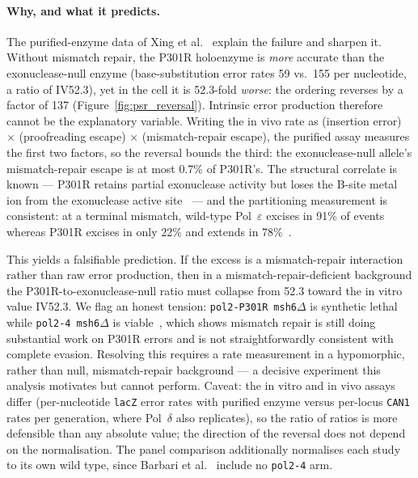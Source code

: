 \documentclass[11pt,a4paper]{article}
\theoremstyle{definition}
\begin{document}
\paragraph{Why, and what it predicts.} The purified-enzyme data of Xing et
al.~\cite{xing2019} explain the failure and sharpen it. Without mismatch repair, the P301R
holoenzyme is \emph{more} accurate than the exonuclease-null enzyme (base-substitution error
rates 59 vs.\ 155 per nucleotide, a ratio of IV52.3), yet in the cell it is 52.3-fold
\emph{worse}: the ordering reverses by a factor of 137 (Figure~\ref{fig:psr_reversal}).
Intrinsic error production therefore cannot be the explanatory variable. Writing the in vivo
rate as (insertion error) $\times$ (proofreading escape) $\times$ (mismatch-repair escape),
the purified assay measures the first two factors, so the reversal bounds the third: the
exonuclease-null allele's mismatch-repair escape is at most 0.7\% of P301R's. The structural
correlate is known --- P301R retains partial exonuclease activity but loses the B-site metal
ion from the exonuclease active site~\cite{parkash2019} --- and the partitioning measurement
is consistent: at a terminal mismatch, wild-type Pol~$\varepsilon$ excises in 91\% of events
whereas P301R excises in only 22\% and extends in 78\%~\cite{xing2019}.

This yields a falsifiable prediction. If the excess is a mismatch-repair interaction rather
than raw error production, then in a mismatch-repair-deficient background the
P301R-to-exonuclease-null ratio must collapse from 52.3 toward the in vitro value IV52.3.
We flag an honest tension: \texttt{pol2-P301R}~\texttt{msh6}$\Delta$ is synthetic lethal while
\texttt{pol2-4}~\texttt{msh6}$\Delta$ is viable~\cite{xing2019}, which shows mismatch repair is
still doing substantial work on P301R errors and is not straightforwardly consistent with
complete evasion. Resolving this requires a rate measurement in a hypomorphic, rather than
null, mismatch-repair background --- a decisive experiment this analysis motivates but cannot
perform. Caveat: the in vitro and in vivo assays differ (per-nucleotide \texttt{lacZ} error
rates with purified enzyme versus per-locus \texttt{CAN1} rates per generation, where
Pol~$\delta$ also replicates), so the ratio of ratios is more defensible than any absolute
value; the direction of the reversal does not depend on the normalisation. The panel
comparison additionally normalises each study to its own wild type, since
Barbari et al.~\cite{barbari2018} include no \texttt{pol2-4} arm.
\end{document}
